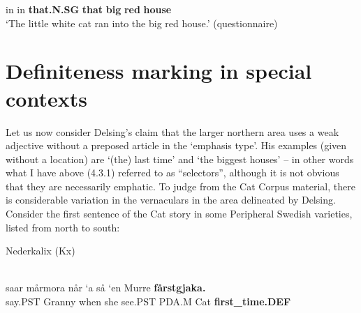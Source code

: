 in  in  \textbf{that.N.SG} \textbf{that} \textbf{big} \textbf{red} \textbf{house} \\

\glt  ‘The little white cat ran into the big red house.’ (questionnaire)

\z

\section{\rmfamily Definiteness marking in special contexts}

Let us now consider Delsing’s claim that the larger northern area uses a weak adjective without a preposed article in the ‘emphasis type’. His examples (given without a location) are  ‘(the) last time’ and  ‘the biggest houses’ – in other words what I have above (4.3.1) referred to as “selectors”, although it is not obvious that they are necessarily emphatic. To judge from the Cat Corpus material, there is considerable variation in the vernaculars in the area delineated by Delsing. Consider the first sentence of the Cat story in some Peripheral Swedish varieties, listed from north to south:


\item 


\item 

Nederkalix (Kx)



 \ea\label{}
\\

 \ea\label{}
\gll saar  mårmora  når  ‘a  så  ‘en  Murre  \textbf{fårstgjaka.}\\


say.PST  Granny  when  she  see.PST  PDA.M  Cat  \textbf{first\_time.DEF}\\

